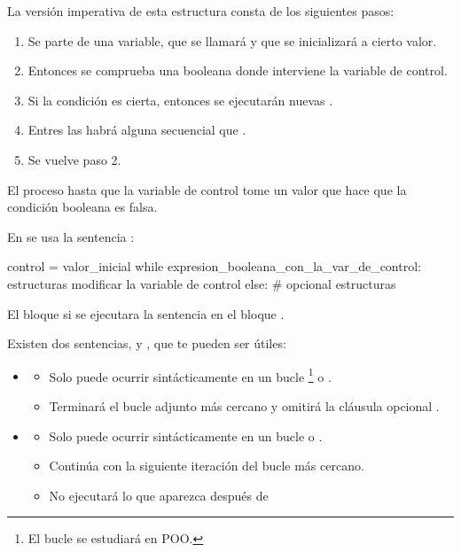 La versión imperativa de esta estructura consta de los siguientes pasos:

\begin{enumerate}\setlength{\itemsep}{0mm} \small
\item Se parte de una variable, que se llamará  y que se inicializará a cierto valor. 

\item Entonces se comprueba una  booleana donde interviene la variable de control. 

\item Si la condición es cierta, entonces se ejecutarán nuevas . 

\item Entres las  habrá alguna secuencial que .

\item Se vuelve paso 2.
\end{enumerate}

El proceso  hasta que la variable de control tome un valor que hace que la condición booleana es falsa.

En  se usa la sentencia :

\begin{pyverbatim}[][frame=single, fontsize=\footnotesize]
control = valor_inicial
while expresion_booleana_con_la_var_de_control:
    estructuras
    modificar la variable de control
else: # opcional
   estructuras
\end{pyverbatim}


El bloque   si se ejecutara la sentencia  en el bloque .


Existen dos sentencias,  y , que te pueden ser útiles:

\begin{itemize}

\item {} 

\begin{itemize}
\item Solo puede ocurrir sintácticamente en un bucle \footnote{El bucle  se estudiará en POO.} o .
\item Terminará el bucle adjunto más cercano y omitirá la cláusula opcional .
\end{itemize}

\item {} 

\begin{itemize}
\item Solo puede ocurrir sintácticamente en un bucle  o .
\item Continúa con la siguiente iteración del bucle  más cercano.
\item No ejecutará lo que aparezca después de  
\end{itemize}

\end{itemize}


